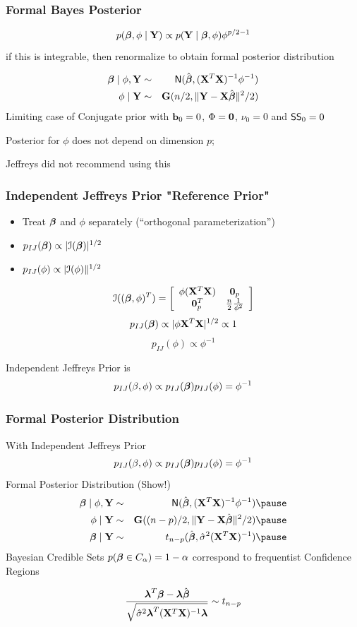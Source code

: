 \documentclass[handout]{beamer}\usepackage[]{graphicx}\usepackage[]{color}
\begin{document}
\begin{frame}
  \frametitle{Formal Bayes Posterior}
$$  p(\boldsymbol{\beta}, \phi \mid \mathbf{Y}) \propto p(\mathbf{Y} \mid \boldsymbol{\beta}, \phi)  \phi^{p/2 - 1} $$
\pause
if this is integrable, then renormalize to obtain formal posterior
distribution \pause


\begin{eqnarray*}
  \boldsymbol{\beta} \mid \phi, \mathbf{Y} & \sim & \textsf{N}(\hat{\boldsymbol{\beta}}, (\mathbf{X}^T\mathbf{X})^{-1} \phi^{-1}) \\
  \phi \mid \mathbf{Y} & \sim& \mathbf{G}(n/2, \| \mathbf{Y} - \mathbf{X}\hat{\boldsymbol{\beta}} \|^2/2)
\end{eqnarray*} \pause
Limiting case of Conjugate prior with $\mathbf{b}_0 = 0$, $\Phi = \mathbf{0}$,
$\nu_0 = 0$ and $\textsf{SS}_0 = 0$ \pause

Posterior for $\phi$ does not depend on dimension $p$;   \pause

\vfill
Jeffreys did not recommend using this
\end{frame}
\begin{frame}
  \frametitle{Independent Jeffreys Prior "Reference Prior"}
  \begin{itemize}
  \item  Treat $\boldsymbol{\beta}$ and $\phi$ separately  (``orthogonal
    parameterization'') \pause
  \item $p_{IJ}(\boldsymbol{\beta}) \propto |{\cal{I}}(\boldsymbol{\beta})|^{1/2}$ \pause
\item $p_{IJ}(\phi) \propto |{\cal{I}}(\phi)\|^{1/2}$ \pause
  \end{itemize}
$$
{\cal{I}}((\boldsymbol{\beta}, \phi)^T)  =  \left[
  \begin{array}{cc}
    \phi (\mathbf{X}^T\mathbf{X}) & \mathbf{0}_p \\
  \mathbf{0}_p^T & \frac{n}{2} \frac{1}{\phi^2}
  \end{array}
\right]
$$
\pause
$$p_{IJ}(\boldsymbol{\beta}) \propto |\phi \mathbf{X}^T\mathbf{X}|^{1/2} \propto 1$$ \pause
$$p_{IJ}(\phi) \propto \phi^{-1}$$ \pause

Independent Jeffreys Prior is
$$p_{IJ}(\beta, \phi) \propto p_{IJ}(\boldsymbol{\beta}) p_{IJ}(\phi) = \phi^{-1}$$

\end{frame}
\begin{frame}
  \frametitle{Formal Posterior Distribution}
  With Independent Jeffreys Prior
$$p_{IJ}(\beta, \phi) \propto p_{IJ}(\boldsymbol{\beta}) p_{IJ}(\phi) = \phi^{-1}$$
\pause
Formal Posterior Distribution  (Show!)
\pause
\begin{eqnarray*}
  \b \mid \phi, \Y & \sim & \N(\bhat, (\X^T\X)^{-1} \phi^{-1}) \pause \\
  \phi \mid \Y & \sim& \G((n-p)/2, \| \Y - \X\bhat \|^2/2) \pause\\
\b \mid \Y & \sim & t_{n-p}(\bhat, \shat (\X^T\X)^{-1})\pause
\end{eqnarray*}
Bayesian Credible Sets
$p(\boldsymbol{\beta} \in C_\alpha) = 1- \alpha$ correspond to frequentist Confidence
Regions

$$\frac{\boldsymbol{\lambda}^T\boldsymbol{\beta} - \boldsymbol{\lambda}\hat{\boldsymbol{\beta}}}
{\sqrt{{\hat{\sigma}}^2 \boldsymbol{\lambda}^T(\mathbf{X}^T\mathbf{X})^{-1} \boldsymbol{\lambda}}} \sim t_{n-p}$$

\end{frame}
\end{document}
